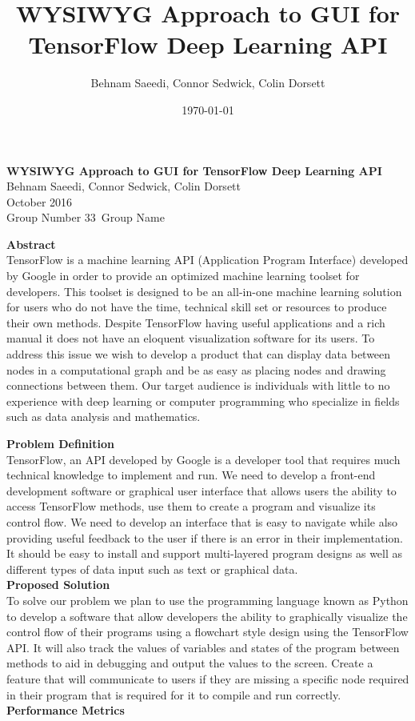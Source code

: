 \documentclass[a4paper,10pt]{IEEETran}
\title{WYSIWYG Approach to GUI for TensorFlow Deep Learning API}
\author{Behnam Saeedi, Connor Sedwick, Colin Dorsett}
\date{\today}
\newcommand*\Title{WYSIWYG Approach to GUI for TensorFlow Deep Learning API}
\newcommand*\Date{October 2016}
\newcommand*\Author{Behnam Saeedi, Connor Sedwick, Colin Dorsett}
\newcommand*\GroupNumber{Group Number 33}
\newcommand*\GroupName{Group Name}
\begin{document}
	\begin{titlepage}
		\vspace*{\fill}
			\begin{center}
				\noindent \textbf{\Huge\Title} \\
				\large\Author \\
				\large\Date \\
				\large\GroupNumber \, \large\GroupName
			\end{center}
			\noindent \textbf{Abstract} \\
			\indent TensorFlow is a machine learning API (Application Program Interface) developed by Google in order to provide an optimized machine learning toolset for developers.
			 This toolset is designed to be an all-in-one machine learning solution for users who do not have the time, technical skill set or resources to produce their own methods.
			 Despite TensorFlow having useful applications and a rich manual it does not have an eloquent visualization software for its users.
			 To address this issue we wish to develop a product that can display data between nodes in a computational graph and be as easy as placing nodes and drawing connections between them.
			 Our target audience is individuals with little to no experience with deep learning or computer programming who specialize in fields such as data analysis and mathematics.\\
		\vspace*{\fill}
	\end{titlepage}

	\noindent \textbf{Problem Definition}\\
	\indent TensorFlow, an API developed by Google is a developer tool that requires much technical knowledge to implement and run.
	 We need to develop a front-end development software or graphical user interface that allows users the ability to access TensorFlow methods, use them to create a program and visualize its control flow.
	 We need to develop an interface that is easy to navigate while also providing useful feedback to the user if there is an error in their implementation.
	 It should be easy to install and support multi-layered program designs as well as different types of data input such as text or graphical data.\\

	\noindent \textbf{Proposed Solution}\\
	\indent To solve our problem we plan to use the programming language known as Python to develop a software that allow developers the ability to graphically visualize the control flow of their programs using a flowchart style design using the TensorFlow API.
	 It will also track the values of variables and states of the program between methods to aid in debugging and output the values to the screen.
	 Create a feature that will communicate to users if they are missing a specific node required in their program that is required for it to compile and run correctly.\\

	\noindent \textbf{Performance Metrics}\\
	\indent 
\end{document}
